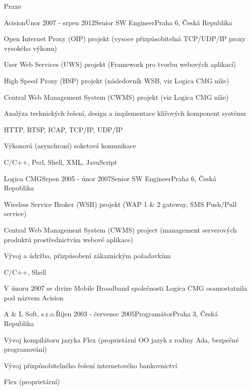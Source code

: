 \documentclass{resume} %
\begin{document}
\begin{rSection}{Praxe}

\begin{rSubsection}{Acision}{\'{U}nor 2007 - srpen 2012}{Senior SW Engineer}{Praha 6, \v{C}esk\'{a} Republika}
\item Open Internet Proxy (OIP) projekt (vysoce p\v{r}izp\r{u}sobiteln\'{a} TCP/UDP/IP proxy vysok\'{e}ho v\'{y}konu)
\item User Web Services (UWS) projekt (Framework pro tvorbu webov\'{y}ch aplikac\'{i})
\item High Speed Proxy (HSP) projekt (n\'{a}sledovn\'{i}k WSB, viz Logica CMG n\'{i}\v{z}e)
\item Central Web Management System (CWMS) projekt (viz Logica CMG n\'{i}\v{z}e)
\item Anal\'{y}za technick\'{y}ch \v{r}e\v{s}en\'{i}, design a implementace kl\'{i}\v{c}ov\'{y}ch komponent syst\'{e}mu
\item HTTP, RTSP, ICAP, TCP/IP, UDP/IP
\item V\'{y}konov\'{a} (asynchron\'{i}) soketov\'{a} komunikace
\item C/C++, Perl, Shell, XML, JavaScript
\end{rSubsection}


\begin{rSubsection}{Logica CMG}{Srpen 2005 - \'{u}nor 2007}{Senior SW Engineer}{Praha 6, \v{C}esk\'{a} Republika}
\item Wireless Service Broker (WSB) projekt (WAP 1 \& 2 gateway, SMS Push/Pull service)
\item Central Web Management System (CWMS) project (management serverov\'{y}ch produkt\r{u} prost\v{r}ednictv\'{i}m webov\'{e} aplikace)
\item V\'{y}voj a \'{u}dr\v{z}ba, p\v{r}izp\r{u}soben\'{i} z\'{a}kaznick\'{y}m po\v{z}adavk\r{u}m
\item C/C++, Shell
\item V \'{u}noru 2007 se divize Mobile Broadband spole\v{c}nosti Logica CMG osamostatnila pod n\'{a}zvem Acision
\end{rSubsection}


\begin{rSubsection}{A \& L Soft, s.r.o.}{\v{R}\'{i}jen 2003 - \v{c}ervenec 2005}{Program\'{a}tor}{Praha 3, \v{C}esk\'{a} Republika}
\item V\'{y}voj kompil\'{a}toru jazyka Flex (propriet\'{a}rn\'{i} OO jazyk z rodiny Ada, bezpe\v{c}n\'{e} programov\'{a}n\'{i})
\item V\'{y}voj p\v{r}izp\r{u}sobiteln\'{e}ho \v{r}e\v{s}en\'{i} internetov\'{e}ho bankovnictv\'{i}
\item Flex (propriet\'{a}rn\'{i})
\end{rSubsection}

\end{rSection}
\end{document}

